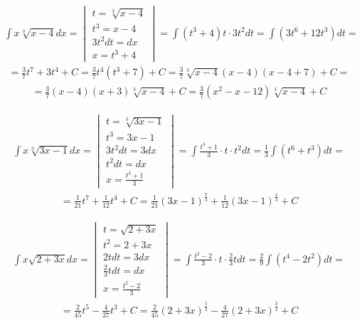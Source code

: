 
\begin{gather*}\int x\sqrt[3]{x-4}dx = \begin{vmatrix} t=\sqrt[3]{x-4} \\ t^3=x-4 \\ 3t^2dt=dx \\ x=t^3+4 \end{vmatrix} = \int (t^3+4)t \cdot 3t^2dt = \int (3t^6+12t^3)dt = \end{gather*}
\begin{gather*}=  \frac{3}{7}t^7+3t^4+C = \frac{3}{7}t^4(t^3+7)+C = \frac{3}{7}\sqrt[3]{x-4}(x-4)(x-4+7)+C = \end{gather*}
\begin{gather*}=\frac{3}{7}(x-4)(x+3)\sqrt[3]{x-4}+C=\frac{3}{7}(x^2-x-12)\sqrt[3]{x-4}+C\end{gather*}



\begin{gather*}\int x\sqrt[3]{3x-1}dx = \begin{vmatrix} t=\sqrt[3]{3x-1} \\ t^3=3x-1 \\ 3t^2dt=3dx \\ t^2dt=dx \\ x=\frac{t^3+1}{3} \end{vmatrix} = \int \frac{t^3+1}{3} \cdot t \cdot t^2dt = \frac{1}{3} \int (t^6+t^3)dt = \end{gather*}
\begin{gather*}= \frac{1}{21}t^7+\frac{1}{12}t^4 + C = \frac{1}{21}(3x-1)^{\frac{7}{3}}+\frac{1}{12}(3x-1)^{\frac{4}{3}}+C\end{gather*}



\begin{gather*}\int x\sqrt{2+3x}dx = \begin{vmatrix} t=\sqrt{2+3x} \\ t^2=2+3x \\ 2tdt=3dx \\ \frac{2}{3}tdt=dx \\ x=\frac{t^2-2}{3} \end{vmatrix} = \int \frac{t^2-2}{3} \cdot t \cdot \frac{2}{3}tdt = \frac{2}{9} \int (t^4-2t^2)dt = \end{gather*}
\begin{gather*}= \frac{2}{45}t^5-\frac{4}{27}t^3 +C= \frac{2}{45}(2+3x)^{\frac{5}{2}}-\frac{4}{27}(2+3x)^{\frac{3}{2}}+C\end{gather*}


